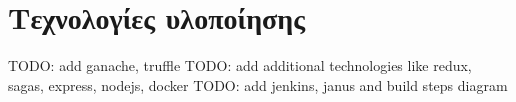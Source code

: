\section{Τεχνολογίες υλοποίησης}

TODO: add ganache, truffle
TODO: add additional technologies like redux, sagas, express, nodejs, docker
TODO: add jenkins, janus and build steps diagram
